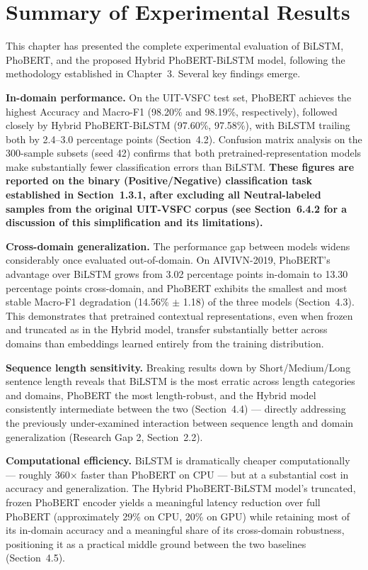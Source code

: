 \documentclass[12pt]{report} %
\begin{document}
\section{Summary of Experimental Results}

This chapter has presented the complete experimental evaluation of BiLSTM, PhoBERT, and the proposed Hybrid PhoBERT-BiLSTM model, following the methodology established in Chapter~3. Several key findings emerge.

\textbf{In-domain performance.} On the UIT-VSFC test set, PhoBERT achieves the highest Accuracy and Macro-F1 (98.20\% and 98.19\%, respectively), followed closely by Hybrid PhoBERT-BiLSTM (97.60\%, 97.58\%), with BiLSTM trailing both by 2.4--3.0 percentage points (Section~4.2). Confusion matrix analysis on the 300-sample subsets (seed 42) confirms that both pretrained-representation models make substantially fewer classification errors than BiLSTM. \textbf{These figures are reported on the binary (Positive/Negative) classification task established in Section~1.3.1, after excluding all Neutral-labeled samples from the original UIT-VSFC corpus (see Section~6.4.2 for a discussion of this simplification and its limitations).}

\textbf{Cross-domain generalization.} The performance gap between models widens considerably once evaluated out-of-domain. On AIVIVN-2019, PhoBERT's advantage over BiLSTM grows from 3.02 percentage points in-domain to 13.30 percentage points cross-domain, and PhoBERT exhibits the smallest and most stable Macro-F1 degradation (14.56\% $\pm$ 1.18) of the three models (Section~4.3). This demonstrates that pretrained contextual representations, even when frozen and truncated as in the Hybrid model, transfer substantially better across domains than embeddings learned entirely from the training distribution.

\textbf{Sequence length sensitivity.} Breaking results down by Short/Medium/Long sentence length reveals that BiLSTM is the most erratic across length categories and domains, PhoBERT the most length-robust, and the Hybrid model consistently intermediate between the two (Section~4.4) --- directly addressing the previously under-examined interaction between sequence length and domain generalization (Research Gap 2, Section~2.2).

\textbf{Computational efficiency.} BiLSTM is dramatically cheaper computationally --- roughly 360$\times$ faster than PhoBERT on CPU --- but at a substantial cost in accuracy and generalization. The Hybrid PhoBERT-BiLSTM model's truncated, frozen PhoBERT encoder yields a meaningful latency reduction over full PhoBERT (approximately 29\% on CPU, 20\% on GPU) while retaining most of its in-domain accuracy and a meaningful share of its cross-domain robustness, positioning it as a practical middle ground between the two baselines (Section~4.5).
\end{document}
